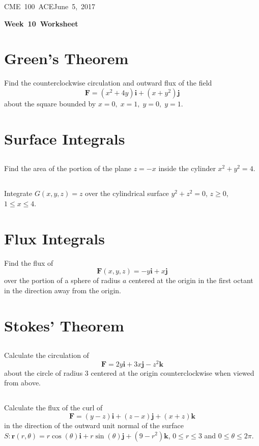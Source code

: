 \documentclass[letterpaper, 11pt]{article}
\makeatletter
\newcommand{\hmwkTitle}{Week\ 10\ Worksheet} %
\newcommand{\hmwkClass}{CME\ 100\ ACE} %
\newcommand{\hmwkAuthorName}{Timothy Anderson} %
\newcommand{\hmwkAuthorEmail}{timmya@stanford.edu} %
\makeatother
\begin{document}
\noindent
\normalsize 
\hmwkClass \hfill June\ 5,\ 2017\\

\begin{center} \Large \textbf{\hmwkTitle} \end{center}

\section{Green's Theorem}
Find the counterclockwise circulation and outward flux of the field
\[ \bm{F} = (x^2 + 4y)\bm{i} + (x + y^2)\bm{j} \]
about the square bounded by $x = 0,\;x = 1,\;y = 0,\;y = 1$. 

\section{Surface Integrals}
\subsection{} Find the area of the portion of the plane $z = -x$ inside the cylinder $x^2+y^2=4$.

\subsection{} Integrate $G(x,y,z) = z$ over the  cylindrical surface $y^2 +z^2 = 0$, $z \geq 0$, $1 \leq x \leq 4$. 

\section{Flux Integrals}
Find the flux of
\[ \mathbf{F}(x,y,z) =  -y \bm{i} + x \bm{j} \]
over the portion of a sphere of radius $a$ centered at the origin in the first octant in the direction away from the origin.


\section{Stokes' Theorem}
\subsection{} Calculate the circulation of 
\[ \bm{F} = 2 y \bm{i} + 3x \bm{j} - z^2 \bm{k} \]
about the circle of radius 3 centered at the origin counterclockwise when viewed from above. 

\subsection{} Calculate the flux of the curl of 
\[ \bm{F} = (y-z)\bm{i} + (z - x)\bm{j} + (x + z) \bm{k} \]
in the direction of the outward unit normal of the surface $S : \bm{r}(r,\theta) = r \cos(\theta) \bm{i} + r \sin(\theta) \bm{j} + (9 - r^2) \bm{k}$, $ 0 \leq r \leq 3$ and $ 0 \leq \theta \leq 2 \pi$. 
\end{document}
